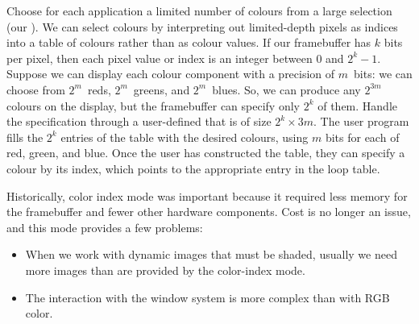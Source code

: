 \documentclass[../notes.tex]{subfiles}
\begin{document}
        Choose for each application a limited number of colours from a large selection
        (our ).
        We can select colours by interpreting out limited-depth pixels as indices into a table
        of colours rather than as colour values.
        If our framebuffer has $k$ bits per pixel, then each pixel value or index is an integer
        between $0$ and $2^k - 1$.
        Suppose we can display each colour component with a precision of $m$~bits:
        we can choose from $2^m$~reds, $2^m$~greens, and $2^m$~blues.
        So, we can produce any $2^{3m}$ colours on the display,
        but the framebuffer can specify only $2^k$ of them.
        Handle the specification through a user-defined 
        that is of size $2^k \times 3m$.
        The user program fills the $2^k$ entries of the table with the desired colours,
        using $m$ bits for each of red, green, and blue.
        Once the user has constructed the table, they can specify a colour by its index,
        which points to the appropriate entry in the loop table.

        Historically, color index mode was important because it required less memory
        for the framebuffer and fewer other hardware components.
        Cost is no longer an issue, and this mode provides a few problems:
        \begin{itemize}
          \item When we work with dynamic images that must be shaded,
            usually we need more images than are provided by the color-index mode.
          \item The interaction with the window system is more complex than with RGB color.
        \end{itemize}
\end{document}
